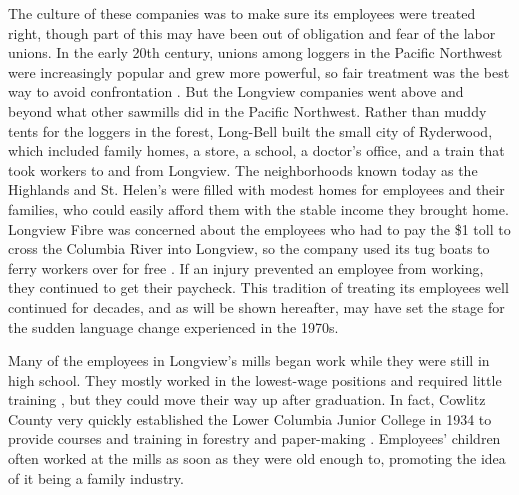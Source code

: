 The culture of these companies was to make sure its employees were treated right, though part of this may have been out of obligation and fear of the labor unions. In the early 20th century, unions among loggers in the Pacific Northwest were increasingly popular and grew more powerful, so fair treatment was the best way to avoid confrontation \citep[145]{urrutia_1998}. But the Longview companies went above and beyond what other sawmills did in the Pacific Northwest. Rather than muddy tents for the loggers in the forest, Long-Bell built the small city of Ryderwood, which included family homes, a store, a school, a doctor's office, and a train that took workers to and from Longview. The neighborhoods known today as the Highlands and St. Helen's were filled with modest homes for employees and their families, who could easily afford them with the stable income they brought home. Longview Fibre was concerned about the employees who had to pay the \$1 toll to cross the Columbia River into Longview, so the company used its tug boats to ferry workers over for free \citep[102]{wilma_2017}. If an injury prevented an employee from working, they continued to get their paycheck. This tradition of treating its employees well continued for decades, and as will be shown hereafter, may have set the stage for the sudden language change experienced in the 1970s.

Many of the employees in Longview's mills began work while they were still in high school. They mostly worked in the lowest-wage positions and required little training \citep[133]{wilma_2017}, but they could move their way up after graduation. In fact, Cowlitz County very quickly established the Lower Columbia Junior College in 1934 to provide courses and training in forestry and paper-making \citep[173-174]{urrutia_1998}. Employees' children often worked at the mills as soon as they were old enough to, promoting the idea of it being a family industry.

